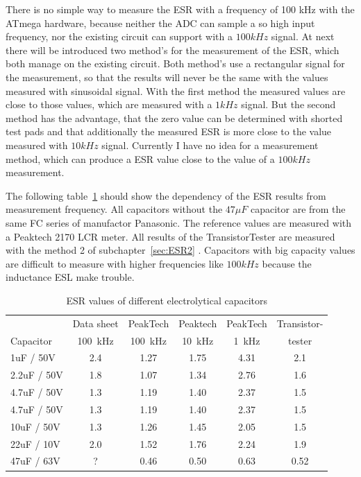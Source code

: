 There is no simple way to measure the ESR with a frequency of 100 kHz with the ATmega hardware,
because neither the ADC can sample a so high input frequency, nor the existing circuit can support
with a \(100kHz\) signal.
At next there will be introduced two method's for the measurement of the ESR, which both manage on 
the existing circuit.
Both method's use a rectangular signal for the measurement, so that the results will never be
the same with the values measured with sinusoidal signal.
With the first method the measured values are close to those values, which are measured with a
\(1kHz\) signal. 
But the second method has the advantage, that the zero value can be determined with shorted test pads and
that additionally the measured ESR is more close to the value measured with \(10kHz\) signal.
Currently I have no idea for a measurement method, which can produce a ESR value close to the
value of a \(100kHz\) measurement.

The following table~\ref{tab:capESR} should show the dependency of the ESR results from measurement frequency.
All capacitors without the \(47\mu F\) capacitor are from the same FC series of manufactor Panasonic.
The reference values are measured with a Peaktech 2170 LCR meter.
All results of the TransistorTester are measured with the method 2 of subchapter~\ref{sec:ESR2} .
Capacitors with big capacity values are difficult to measure with higher frequencies like \(100kHz\) because
the inductance ESL make trouble.

\begin{table}[H]
  \begin{center}
    \begin{tabular}{| l | c | c | c | c | c |}
   \hline
            & Data sheet & PeakTech  & Peaktech & PeakTech & Transistor- \\
Capacitor   & 100~kHz    & 100~kHz   & 10~kHz   & 1~kHz    & tester  \\
    \hline
    \hline
1uF / 50V    & 2.4       & 1.27      & 1.75     & 4.31     &  2.1 \\
    \hline
2.2uF / 50V  & 1.8       & 1.07      & 1.34     & 2.76     &  1.6 \\
    \hline
4.7uF / 50V  & 1.3       & 1.19      & 1.40     & 2.37     &  1.5 \\
    \hline
4.7uF / 50V  & 1.3       & 1.19      & 1.40     & 2.37     &  1.5 \\
    \hline
10uF / 50V   & 1.3       & 1.26      & 1.45     & 2.05     &  1.5 \\
    \hline
22uF / 10V   & 2.0       & 1.52      & 1.76     & 2.24     &  1.9 \\
    \hline
47uF / 63V   & ?         & 0.46      & 0.50     & 0.63     &  0.52 \\
    \hline
    \end{tabular}
  \end{center}
  \caption{ESR values of different electrolytical capacitors}
  \label{tab:capESR} 
\end{table}


